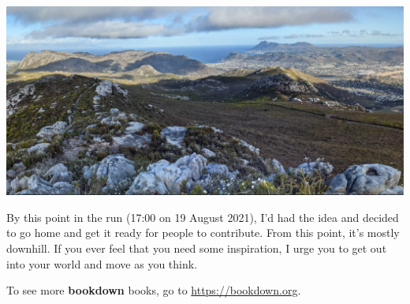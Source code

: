 \documentclass[
]{krantz}
\begin{document}
\includegraphics{figures/running-space.PNG}

By this point in the run (17:00 on 19 August 2021), I'd had the idea and decided to go home and get it ready for people to contribute. From this point, it's mostly downhill. If you ever feel that you need some inspiration, I urge you to get out into your world and move as you think.

To see more \textbf{bookdown} books, go to \url{https://bookdown.org}.

  

\backmatter
\printindex
\end{document}
